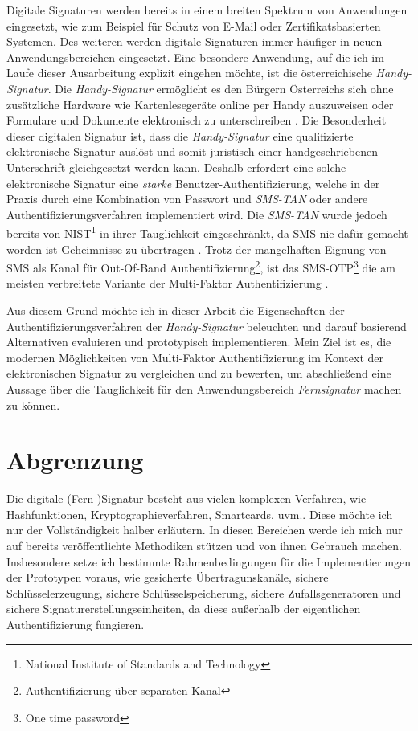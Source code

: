\documentclass[11pt,a4paper,ngerman]{scrreprt}
\begin{document}
Digitale Signaturen werden bereits in einem breiten Spektrum von Anwendungen eingesetzt, wie zum Beispiel für Schutz von E-Mail oder Zertifikatsbasierten Systemen. Des weiteren werden digitale Signaturen immer häufiger in neuen Anwendungsbereichen eingesetzt. Eine besondere Anwendung, auf die ich im Laufe dieser Ausarbeitung explizit eingehen möchte, ist die österreichische \textit{Handy-Signatur}. Die \textit{Handy-Signatur} ermöglicht es den Bürgern Österreichs sich ohne zusätzliche Hardware wie Kartenlesegeräte online per Handy auszuweisen oder Formulare und Dokumente elektronisch zu unterschreiben \cite{handySigOnline}. Die Besonderheit dieser digitalen Signatur ist, dass die \textit{Handy-Signatur} eine qualifizierte elektronische Signatur auslöst und somit juristisch einer handgeschriebenen Unterschrift gleichgesetzt werden kann. Deshalb erfordert eine solche elektronische Signatur eine \emph{starke} Benutzer-Authentifizierung, welche in der Praxis durch eine Kombination von Passwort und \textit{SMS-TAN} oder andere Authentifizierungsverfahren implementiert wird. Die \textit{SMS-TAN} wurde jedoch bereits von NIST\footnote{National Institute of Standards and Technology} in ihrer Tauglichkeit eingeschränkt, da SMS nie dafür gemacht worden ist Geheimnisse zu übertragen \cite{mobileSec,NIST800-63B}. Trotz der mangelhaften Eignung von SMS als Kanal für Out-Of-Band Authentifizierung\footnote{Authentifizierung über separaten Kanal}, ist das SMS-OTP\footnote{One time password} die am meisten verbreitete Variante der Multi-Faktor Authentifizierung \cite[Abb. 3]{fido17}.

Aus diesem Grund möchte ich in dieser Arbeit die Eigenschaften der Authentifizierungsverfahren der \textit{Handy-Signatur} beleuchten und darauf basierend Alternativen evaluieren und prototypisch implementieren. Mein Ziel ist es, die modernen Möglichkeiten von Multi-Faktor Authentifizierung im Kontext der elektronischen Signatur zu vergleichen und zu bewerten, um abschließend eine Aussage über die Tauglichkeit für den Anwendungsbereich \textit{Fernsignatur} machen zu können.

\section*{Abgrenzung}
Die digitale (Fern-)Signatur besteht aus vielen komplexen Verfahren, wie Hashfunktionen, Kryptographieverfahren, Smartcards, uvm.. Diese möchte ich nur der Vollständigkeit halber erläutern. In diesen Bereichen werde ich mich nur auf bereits veröffentlichte Methodiken stützen und von ihnen Gebrauch machen. Insbesondere setze ich bestimmte Rahmenbedingungen für die Implementierungen der Prototypen voraus, wie gesicherte Übertragunskanäle, sichere Schlüsselerzeugung, sichere Schlüsselspeicherung, sichere Zufallsgeneratoren und sichere Signaturerstellungseinheiten, da diese außerhalb der eigentlichen Authentifizierung fungieren.
\clearpage
\end{document}
